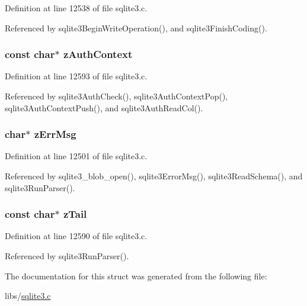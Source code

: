 Definition at line 12538 of file sqlite3.\+c.



Referenced by sqlite3\+Begin\+Write\+Operation(), and sqlite3\+Finish\+Coding().

\hypertarget{struct_parse_a7daea745aae6a12901c52fd4f28608dc}{}
\subsubsection[{z\+Auth\+Context}]{\setlength{\rightskip}{0pt plus 5cm}const char$\ast$ z\+Auth\+Context}\label{struct_parse_a7daea745aae6a12901c52fd4f28608dc}


Definition at line 12593 of file sqlite3.\+c.



Referenced by sqlite3\+Auth\+Check(), sqlite3\+Auth\+Context\+Pop(), sqlite3\+Auth\+Context\+Push(), and sqlite3\+Auth\+Read\+Col().

\hypertarget{struct_parse_a6fcf95fd4e53f09793171bd5b704ac9a}{}
\subsubsection[{z\+Err\+Msg}]{\setlength{\rightskip}{0pt plus 5cm}char$\ast$ z\+Err\+Msg}\label{struct_parse_a6fcf95fd4e53f09793171bd5b704ac9a}


Definition at line 12501 of file sqlite3.\+c.



Referenced by sqlite3\+\_\+blob\+\_\+open(), sqlite3\+Error\+Msg(), sqlite3\+Read\+Schema(), and sqlite3\+Run\+Parser().

\hypertarget{struct_parse_a348e455e10b33438eb61659f0364d546}{}
\subsubsection[{z\+Tail}]{\setlength{\rightskip}{0pt plus 5cm}const char$\ast$ z\+Tail}\label{struct_parse_a348e455e10b33438eb61659f0364d546}


Definition at line 12590 of file sqlite3.\+c.



Referenced by sqlite3\+Run\+Parser().



The documentation for this struct was generated from the following file\+:\begin{DoxyCompactItemize}
\item 
libs/\hyperlink{sqlite3_8c}{sqlite3.\+c}\end{DoxyCompactItemize}
